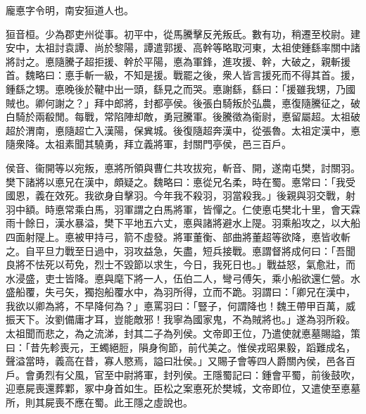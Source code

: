 
\begin{pinyinscope}
龐悳字令明，南安狟道人也。

狟音桓。少為郡吏州從事。初平中，從馬騰擊反羌叛氐。數有功，稍遷至校尉。建安中，太祖討袁譚、尚於黎陽，譚遣郭援、高幹等略取河東，太祖使鍾繇率關中諸將討之。悳隨騰子超拒援、幹於平陽，悳為軍鋒，進攻援、幹，大破之，親斬援首。魏略曰：悳手斬一級，不知是援。戰罷之後，衆人皆言援死而不得其首。援，鍾繇之甥。悳晚後於鞬中出一頭，繇見之而哭。悳謝繇，繇曰：「援雖我甥，乃國賊也。卿何謝之？」拜中郎將，封都亭侯。後張白騎叛於弘農，悳復隨騰征之，破白騎於兩殽閒。每戰，常陷陣却敵，勇冠騰軍。後騰徵為衞尉，悳留屬超。太祖破超於渭南，悳隨超亡入漢陽，保兾城。後復隨超奔漢中，從張魯。太祖定漢中，悳隨衆降。太祖素聞其驍勇，拜立義將軍，封關門亭侯，邑三百戶。

侯音、衞開等以宛叛，悳將所領與曹仁共攻拔宛，斬音、開，遂南屯樊，討關羽。樊下諸將以悳兄在漢中，頗疑之。魏略曰：悳從兄名柔，時在蜀。悳常曰：「我受國恩，義在效死。我欲身自擊羽。今年我不殺羽，羽當殺我。」後親與羽交戰，射羽中額。時悳常乘白馬，羽軍謂之白馬將軍，皆憚之。仁使悳屯樊北十里，會天霖雨十餘日，漢水暴溢，樊下平地五六丈，悳與諸將避水上隄。羽乘船攻之，以大船四面射隄上。悳被甲持弓，箭不虛發。將軍董衡、部曲將董超等欲降，悳皆收斬之。自平旦力戰至日過中，羽攻益急，矢盡，短兵接戰。悳謂督將成何曰：「吾聞良將不怯死以苟免，烈士不毀節以求生，今日，我死日也。」戰益怒，氣愈壯，而水浸盛，吏士皆降。悳與麾下將一人，伍伯二人，彎弓傅矢，乘小船欲還仁營。水盛船覆，失弓矢，獨抱船覆水中，為羽所得，立而不跪。羽謂曰：「卿兄在漢中，我欲以卿為將，不早降何為？」悳罵羽曰：「豎子，何謂降也！魏王帶甲百萬，威振天下。汝劉備庸才耳，豈能敵邪！我寧為國家鬼，不為賊將也。」遂為羽所殺。太祖聞而悲之，為之流涕，封其二子為列侯。文帝即王位，乃遣使就悳墓賜謚，策曰：「昔先軫喪元，王蠋絕脰，隕身徇節，前代美之。惟侯戎昭果毅，蹈難成名，聲溢當時，義高在昔，寡人愍焉，謚曰壯侯。」又賜子會等四人爵關內侯，邑各百戶。會勇烈有父風，官至中尉將軍，封列侯。王隱蜀記曰：鍾會平蜀，前後鼓吹，迎悳屍喪還葬鄴，冢中身首如生。臣松之案悳死於樊城，文帝即位，又遣使至悳墓所，則其屍喪不應在蜀。此王隱之虛說也。


\end{pinyinscope}